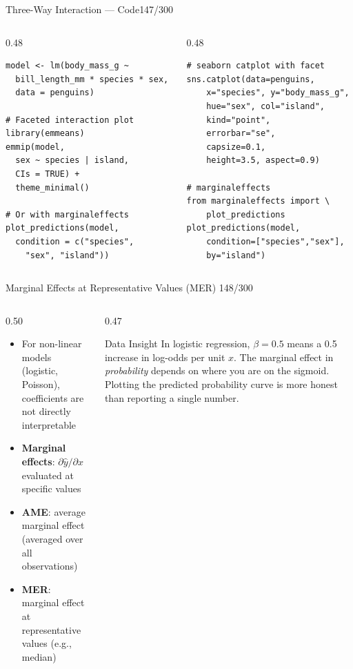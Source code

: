 \documentclass[10pt]{beamer}
\newcommand{\smark}[1]{\hfill{\scriptsize\color{codegray}#1}}
\begin{document}
\begin{frame}[fragile]{Three-Way Interaction --- Code}\smark{147/300}
\begin{columns}[T]
\begin{column}{0.48\textwidth}
\begin{lstlisting}[style=Rstyle]
model <- lm(body_mass_g ~
  bill_length_mm * species * sex,
  data = penguins)

# Faceted interaction plot
library(emmeans)
emmip(model,
  sex ~ species | island,
  CIs = TRUE) +
  theme_minimal()

# Or with marginaleffects
plot_predictions(model,
  condition = c("species",
    "sex", "island"))
\end{lstlisting}
\end{column}
\begin{column}{0.48\textwidth}
\begin{lstlisting}[style=Pystyle]
# seaborn catplot with facet
sns.catplot(data=penguins,
    x="species", y="body_mass_g",
    hue="sex", col="island",
    kind="point",
    errorbar="se",
    capsize=0.1,
    height=3.5, aspect=0.9)

# marginaleffects
from marginaleffects import \
    plot_predictions
plot_predictions(model,
    condition=["species","sex"],
    by="island")
\end{lstlisting}
\end{column}
\end{columns}
\end{frame}

\begin{frame}{Marginal Effects at Representative Values (MER)}
\smark{148/300}
\begin{columns}[T]
\begin{column}{0.50\textwidth}
\begin{itemize}
    \item For non-linear models (logistic, Poisson), coefficients are not directly interpretable
    \item \textbf{Marginal effects}: $\partial \hat{y} / \partial x$ evaluated at specific values
    \item \textbf{AME}: average marginal effect (averaged over all observations)
    \item \textbf{MER}: marginal effect at representative values (e.g., median)
\end{itemize}
\end{column}
\begin{column}{0.47\textwidth}
\begin{exampleblock}{Data Insight}
    \scriptsize In logistic regression, $\beta = 0.5$ means a 0.5 increase in log-odds per unit $x$. The marginal effect in \emph{probability} depends on where you are on the sigmoid. Plotting the predicted probability curve is more honest than reporting a single number.
\end{exampleblock}
\end{column}
\end{columns}
\end{frame}
\end{document}
